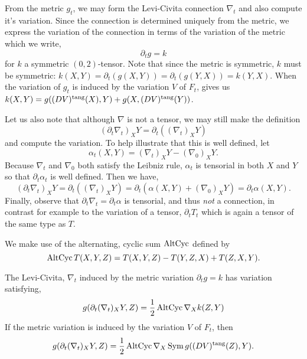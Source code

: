 From the metric \(g_t\), we may form the Levi-Civita connection \(\nabla_t\) and also compute it's variation. Since the connection is determined uniquely from the metric, we express the variation of the connection in terms of the variation of the metric which we write,
\[
\partial_t g = k
\]
for \(k\) a symmetric \((0, 2)\)-tensor. Note that since the metric is symmetric, \(k\) must be symmetric: \(k(X, Y) = \partial_t (g(X, Y)) = \partial_t (g(Y, X)) = k(Y, X)\). When the variation of \(g_t\) is induced by the variation \(V\) of \(F_t\),  gives us \(k(X, Y) = g((DV)^{\operatorname{tang}} (X), Y) + g(X, (DV)^{\operatorname{tang}} (Y))\).

\begin{rem}
Let us also note that although \(\nabla\) is not a tensor, we may still make the definition
\[
(\partial_t \nabla_t)_X Y = \partial_t((\nabla_t)_X Y)
\]
and compute the variation. To help illustrate that this is well defined, let
\[
\alpha_t(X, Y) = (\nabla_{t})_X Y - (\nabla_{0})_X Y.
\]
Because \(\nabla_t\) and \(\nabla_0\) both satisfy the Leibniz rule, \(\alpha_t\) is tensorial in both \(X\) and \(Y\) so that \(\partial_t \alpha_t\) is well defined. Then we have,
\[
(\partial_t \nabla_t)_X Y = \partial_t((\nabla_t)_X Y) = \partial_t (\alpha(X, Y) + (\nabla_{0})_X Y) = \partial_t \alpha (X, Y).
\]
Finally, observe that \(\partial_t \nabla_t = \partial_t \alpha\) is tensorial, and thus \emph{not} a connection, in contrast for example to the variation of a tensor, \(\partial_t T_t\) which is again a tensor of the same type as \(T\).
\end{rem}

We make use of the alternating, cyclic sum \(\operatorname{AltCyc}\) defined by
\[
\operatorname{AltCyc} T(X, Y, Z) = T(X, Y, Z) - T(Y, Z, X) + T(Z, X, Y).
\]

\begin{lemma}
The Levi-Civita, \(\nabla_t\) induced by the metric variation \(\partial_t g = k\) has variation satisfying,
\[
g(\partial_t (\nabla_t)_X Y, Z) = \frac{1}{2} \operatorname{AltCyc} \nabla_X k(Z, Y)
\]
If the metric variation is induced by the variation \(V\) of \(F_t\), then
\[
g(\partial_t (\nabla_t)_X Y, Z) = \frac{1}{2} \operatorname{AltCyc} \nabla_X \operatorname{Sym} g((DV)^{\operatorname{tang}} (Z), Y).
\]
\end{lemma}


